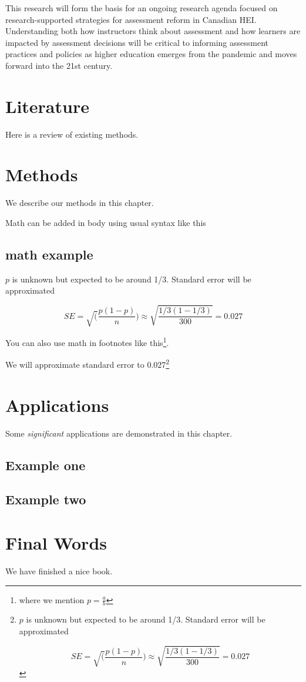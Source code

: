 \documentclass[
]{book}
\begin{document}
This research will form the basis for an ongoing research agenda focused on research-supported strategies for assessment reform in Canadian HEI. Understanding both how instructors think about assessment and how learners are impacted by assessment decisions will be critical to informing assessment practices and policies as higher education emerges from the pandemic and moves forward into the 21st century.

\hypertarget{literature}{%
\chapter{Literature}\label{literature}}

Here is a review of existing methods.

\hypertarget{methods}{%
\chapter{Methods}\label{methods}}

We describe our methods in this chapter.

Math can be added in body using usual syntax like this

\hypertarget{math-example}{%
\section{math example}\label{math-example}}

\(p\) is unknown but expected to be around 1/3. Standard error will be approximated

\[
SE = \sqrt(\frac{p(1-p)}{n}) \approx \sqrt{\frac{1/3 (1 - 1/3)} {300}} = 0.027
\]

You can also use math in footnotes like this\footnote{where we mention \(p = \frac{a}{b}\)}.

We will approximate standard error to 0.027\footnote{\(p\) is unknown but expected to be around 1/3. Standard error will be approximated

  \[
  SE = \sqrt(\frac{p(1-p)}{n}) \approx \sqrt{\frac{1/3 (1 - 1/3)} {300}} = 0.027
  \]}

\hypertarget{applications}{%
\chapter{Applications}\label{applications}}

Some \emph{significant} applications are demonstrated in this chapter.

\hypertarget{example-one}{%
\section{Example one}\label{example-one}}

\hypertarget{example-two}{%
\section{Example two}\label{example-two}}

\hypertarget{final-words}{%
\chapter{Final Words}\label{final-words}}

We have finished a nice book.

  
\end{document}
